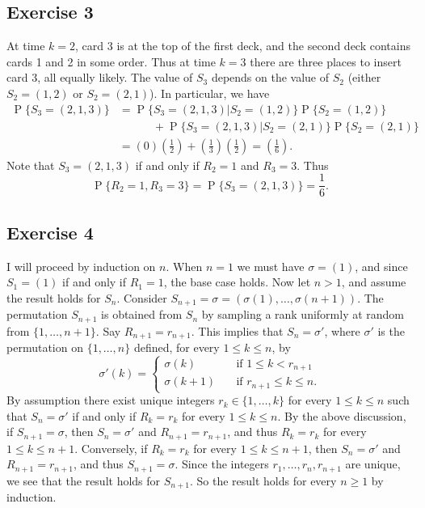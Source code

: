 \documentclass[12pt]{article}
\DeclareMathOperator{\Prob}{P}
\begin{document}
\begin{enumerate}[label=(\alph*)]
\subsection*{Exercise 3}

At time $k=2$, card 3 is at the top of the first deck, and the second deck contains cards 1 and 2 in some order. Thus at time $k=3$ there are three places to insert card 3, all equally likely. The value of $S_3$ depends on the value of $S_2$ (either $S_2 = (1, 2)$ or $S_2 = (2, 1)$). In particular, we have
\begin{align*}
\Prob\{S_3 = (2, 1, 3)\} &= \Prob\{S_3 = (2, 1, 3) | S_2 = (1, 2)\} \Prob\{S_2 = (1, 2)\} \\
&\qquad\quad+ \Prob\{S_3 = (2, 1, 3) | S_2 = (2, 1)\} \Prob\{S_2 = (2, 1)\} \\
&= (0)\left(\frac{1}{2}\right) + \left(\frac{1}{3}\right)\left(\frac{1}{2}\right) = \left(\frac{1}{6}\right).
\end{align*}
Note that $S_3 = (2, 1, 3)$ if and only if $R_2 = 1$ and $R_3 = 3$. Thus
\begin{equation*}
\Prob\{R_2 = 1, R_3 = 3\} = \Prob\{S_3 = (2, 1, 3)\} = \frac{1}{6}.
\end{equation*}

\subsection*{Exercise 4}

I will proceed by induction on $n$. When $n=1$ we must have $\sigma = (1)$, and since $S_1 = (1)$ if and only if $R_1 = 1$, the base case holds. Now let $n > 1$, and assume the result holds for $S_n$. Consider $S_{n+1} = \sigma = (\sigma(1), \ldots, \sigma(n+1))$. The permutation $S_{n+1}$ is obtained from $S_n$ by sampling a rank uniformly at random from $\{1, \ldots, n+1\}$. Say $R_{n+1} = r_{n+1}$. This implies that $S_n = \sigma'$, where $\sigma'$ is the permutation on $\{1, \ldots, n\}$ defined, for every $1 \leq k \leq n$, by
\begin{equation*}
\sigma'(k) = \begin{cases}
\sigma(k) &\quad \text{if $1 \leq k < r_{n+1}$} \\
\sigma(k+1) &\quad \text{if $r_{n+1} \leq k \leq n$}.
\end{cases}
\end{equation*}
By assumption there exist unique integers $r_k \in \{1, \ldots, k\}$ for every $1 \leq k \leq n$ such that $S_n = \sigma'$ if and only if $R_k = r_k$ for every $1 \leq k \leq n$. By the above discussion, if $S_{n+1} = \sigma$, then $S_n = \sigma'$ and $R_{n+1} = r_{n+1}$, and thus $R_k = r_k$ for every $1 \leq k \leq n+1$. Conversely, if $R_k = r_k$ for every $1 \leq k \leq n+1$, then $S_n = \sigma'$ and $R_{n+1} = r_{n+1}$, and thus $S_{n+1} = \sigma$. Since the integers $r_1, \ldots, r_n, r_{n+1}$ are unique, we see that the result holds for $S_{n+1}$. So the result holds for every $n \geq 1$ by induction.


\end{enumerate}
\end{document}
